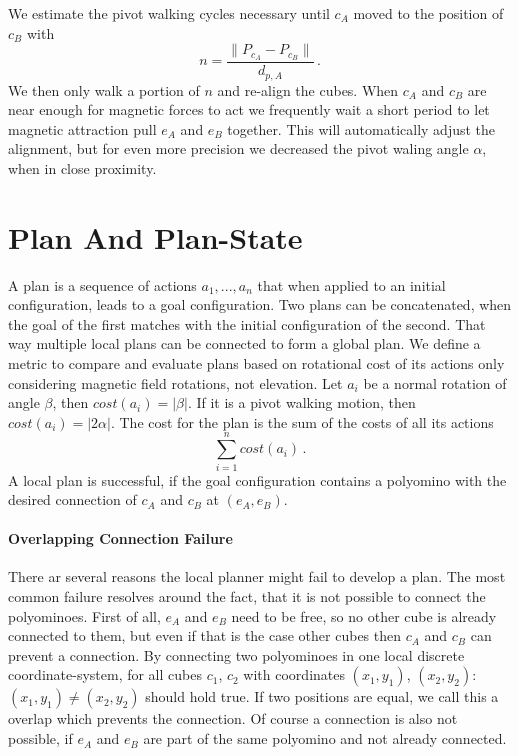 We estimate the pivot walking cycles necessary until $c_A$ moved to the position of $c_B$ with
\begin{equation*}
n = \frac{\lVert P_{c_A} - P_{c_B}\rVert}{d_{p,A}} \,.
\end{equation*}
We then only walk a portion of $n$ and re-align the cubes.
When $c_A$ and $c_B$ are near enough for magnetic forces to act we frequently wait a short period to let magnetic attraction pull $e_A$ and $e_B$ together.
This will automatically adjust the alignment, but for even more precision we decreased the pivot waling angle $\alpha$, when in close proximity.

\section{Plan And Plan-State}
\label{sec:plan}

A plan is a sequence of actions $a_1, ... , a_n$ that when applied to an initial configuration, leads to a goal configuration.
Two plans can be concatenated, when the goal of the first matches with the initial configuration of the second.
That way multiple local plans can be connected to form a global plan.
We define a metric to compare and evaluate plans based on rotational cost of its actions only considering magnetic field rotations, not elevation.
Let $a_i$ be a normal rotation of angle $\beta$, then $cost(a_i) = |\beta|$.
If it is a pivot walking motion, then $cost(a_i) = |2\alpha|$.
The cost for the plan is the sum of the costs of all its actions
\begin{equation*}
\sum_{i=1}^{n} cost(a_i) \,.
\end{equation*}
A local plan is successful, if the goal configuration contains a polyomino with the desired connection of $c_A$ and $c_B$ at $(e_A, e_B)$.

\paragraph{Overlapping Connection Failure}

There ar several reasons the local planner might fail to develop a plan.
The most common failure resolves around the fact, that it is not possible to connect the polyominoes.
First of all, $e_A$ and $e_B$ need to be free, so no other cube is already connected to them, but even if that is the case other cubes then $c_A$ and $c_B$ can prevent a connection.
By connecting two polyominoes in one local discrete coordinate-system, for all cubes $c_1$, $c_2$ with coordinates $(x_1, y_1)$, $(x_2, y_2)$: $(x_1, y_1) \neq (x_2, y_2)$ should hold true.
If two positions are equal, we call this a overlap which prevents the connection.
Of course a connection is also not possible, if $e_A$ and $e_B$ are part of the same polyomino and not already connected.

